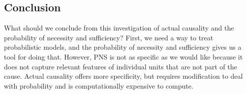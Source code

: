 \documentclass[anon,12pt]{clear2026} %
\begin{document}

\subsection{Conclusion}

What should we conclude from this investigation of actual causality and the probability of necessity and sufficiency?
First, we need a way to treat probabilistic models, and the probability of necessity and sufficiency gives us a tool for doing that.
However, PNS is not as specific as we would like because it does not capture relevant features of individual units that are not part of the cause.
Actual causality offers more specificity, but requires modification to deal with probability and is computationally expensive to compute.
\end{document}
